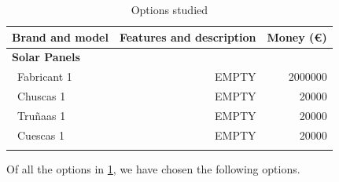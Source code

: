 \begin{longtable}{| l | r | r | }
\hline
\rowcolor[gray]{0.80}	\textbf{Brand and model} &  \textbf{Features and description}     & \textbf{Money (\euro)}   \\
\hline
\endfirsthead

\rowcolor[gray]{0.85} \textbf{Solar Panels} &  &  \\
	   ~Fabricant 1 & EMPTY & 2000000 \\
	   ~Chuscas 1 & EMPTY & 20000 \\
	   ~Truñaas 1 & EMPTY & 20000 \\
	   ~Cuescas 1 & EMPTY & 20000 \\
	\hline

\caption{Options studied}
\label{epsoptionstable}
\end{longtable}

Of all the options in \ref{epsoptionstable}, we have chosen the following options.
